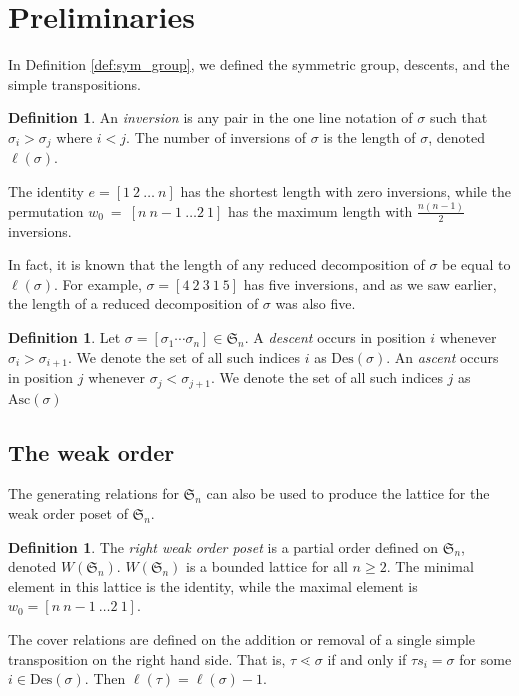\documentclass[11pt,reqno]{amsart}
\theoremstyle{definition}
\newtheorem{definition}[theorem]{Definition}
\theoremstyle{notation}
\newcommand{\Des}{\text{Des}}
\newcommand{\Asc}{\text{Asc}}
\newcommand{\JEem}{\textit}
\begin{document}
\section{Preliminaries} \label{sec:background}


In Definition \ref{def:sym_group}, we defined the symmetric group, descents, and the simple transpositions.  

\begin{definition}
    An \JEem{inversion} is any pair in the one line notation of $\sigma$ such that $\sigma_i>\sigma_j$ where $i<j$. The number of inversions of $\sigma$ is the length of $\sigma$, denoted $\ell(\sigma)$.

    The identity $e=[1 ~2~\ldots ~n]$ has the shortest length with zero inversions, while the permutation $w_0~=~[n~n-1~\ldots 2~1]$ has the maximum length with $\frac{n(n-1)}{2}$ inversions.
\end{definition}

In fact, it is known that the length of any reduced decomposition of $\sigma$ be equal to $\ell(\sigma)$. For example, $\sigma = [4~2~3~1~5]$ has five inversions, and as we saw earlier, the length of a reduced decomposition of $\sigma$ was also five.

\begin{definition}
    Let $\sigma = [\sigma_1\cdots \sigma_n] \in \mathfrak{S}_n$. A \emph{descent} occurs in position $i$ whenever $\sigma_i>\sigma_{i+1}$. We denote the set of all such indices $i$ as $\Des(\sigma)$.
    An \emph{ascent} occurs in position $j$ whenever $\sigma_j<\sigma_{j+1}$. We denote the set of all such indices $j$ as $\Asc(\sigma)$
\end{definition}

\subsection{The weak order}
The generating relations for $\mathfrak{S}_n$ can also be used to produce the lattice for the weak order poset of $\mathfrak{S}_n$.
\begin{definition}
The \JEem{right weak order poset} is a partial order defined on $\mathfrak{S}_n$, denoted $W(\mathfrak{S}_n)$. $W(\mathfrak{S}_n)$ is a bounded lattice for all $n\geq 2$. The minimal element in this lattice is the identity, while the maximal element is $w_0 = [n~n-1~\ldots 2~1]$.
\end{definition}

The cover relations are defined on the addition or removal of a single simple transposition on the right hand side. That is, $\tau \lessdot \sigma$ if and only if $\tau s_i =\sigma$ for some $i\in \Des(\sigma)$. Then $\ell (\tau) = \ell (\sigma) -1$.
\end{document}
